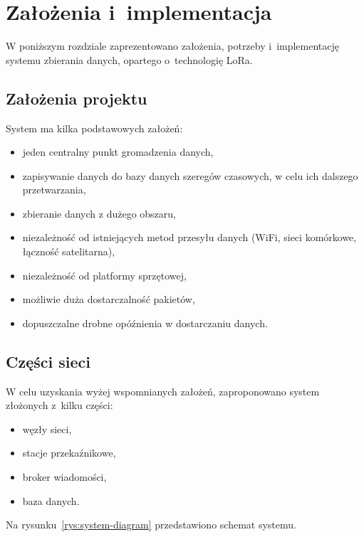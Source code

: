 \chapter{Założenia i~implementacja}
W poniższym rozdziale zaprezentowano założenia, potrzeby i~implementację systemu zbierania danych, opartego o~technologię LoRa.

\section{Założenia projektu}
System ma kilka podstawowych założeń:
\begin{itemize}
    \item jeden centralny punkt gromadzenia danych,
    \item zapisywanie danych do bazy danych szeregów czasowych, w celu ich dalszego przetwarzania,
    \item zbieranie danych z dużego obszaru,
    \item niezależność od istniejących metod przesyłu danych (WiFi, sieci komórkowe, łączność satelitarna),
    \item niezależność od platformy sprzętowej,
    \item możliwie duża dostarczalność pakietów,
    \item dopuszczalne drobne opóźnienia w dostarczaniu danych.
\end{itemize}

\section{Części sieci}
W celu uzyskania wyżej wspomnianych założeń, zaproponowano system złożonych z~kilku części:
\begin{itemize}
    \item węzły sieci,
    \item stacje przekaźnikowe,
    \item broker wiadomości,
    \item baza danych.
\end{itemize}

Na rysunku~\ref{rys:system-diagram} przedstawiono schemat systemu.

